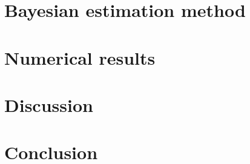 \documentclass[draft]{agujournal2019}
\begin{document}
\subsection{}




\section{Bayesian estimation method}

\section{Numerical results}

\section{Discussion}

\section{Conclusion}

%


%
%
%
%
\end{document}
